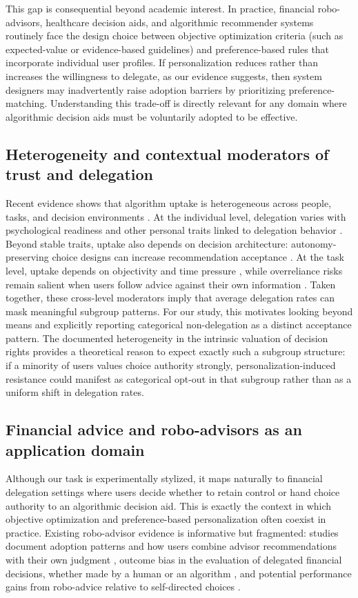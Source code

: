 \documentclass[a4paper, 12pt, fleqn]{article}
\theoremstyle{definition}
\begin{document}
This gap is consequential beyond academic interest. In practice, financial robo-advisors, healthcare decision aids, and algorithmic recommender systems routinely face the design choice between objective optimization criteria (such as expected-value or evidence-based guidelines) and preference-based rules that incorporate individual user profiles. If personalization reduces rather than increases the willingness to delegate, as our evidence suggests, then system designers may inadvertently raise adoption barriers by prioritizing preference-matching. Understanding this trade-off is directly relevant for any domain where algorithmic decision aids must be voluntarily adopted to be effective.

\subsection{Heterogeneity and contextual moderators of trust and delegation}
Recent evidence shows that algorithm uptake is heterogeneous across people, tasks, and decision environments \citep{Ferraz2025,Yang2025}. At the individual level, delegation varies with psychological readiness and other personal traits linked to delegation behavior \citep{Kim2026,Ferraz2025}. Beyond stable traits, uptake also depends on decision architecture: autonomy-preserving choice designs can increase recommendation acceptance \citep{Fink2024}. At the task level, uptake depends on objectivity and time pressure \citep{Yang2025}, while overreliance risks remain salient when users follow advice against their own information \citep{Klingbeil2024}. Taken together, these cross-level moderators imply that average delegation rates can mask meaningful subgroup patterns. For our study, this motivates looking beyond means and explicitly reporting categorical non-delegation as a distinct acceptance pattern. The documented heterogeneity in the intrinsic valuation of decision rights \citep{Bartling2014,Owens2014} provides a theoretical reason to expect exactly such a subgroup structure: if a minority of users values choice authority strongly, personalization-induced resistance could manifest as categorical opt-out in that subgroup rather than as a uniform shift in delegation rates.

\subsection{Financial advice and robo-advisors as an application domain}
Although our task is experimentally stylized, it maps naturally to financial delegation settings where users decide whether to retain control or hand choice authority to an algorithmic decision aid. This is exactly the context in which objective optimization and preference-based personalization often coexist in practice. Existing robo-advisor evidence is informative but fragmented: studies document adoption patterns and how users combine advisor recommendations with their own judgment \citep{Figa-Talamanca2022,Mahmud2025}, outcome bias in the evaluation of delegated financial decisions, whether made by a human or an algorithm \citep{Ismagilova2025}, and potential performance gains from robo-advice relative to self-directed choices \citep{Lambrecht2023}. 
\end{document}
